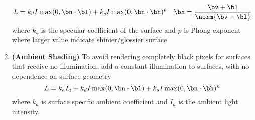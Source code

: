 \documentclass[11pt]{article}
\newcommand{\bheading}[1]{\textbf{(#1)}}
\begin{document}
\begin{enumerate}
    \[
        L = k_d I \max(0, \bn \cdot \bl) + k_s I \max(0, \bn \cdot \bh)^p
        \quad
        \bh = \frac{\bv + \bl}{\norm{\bv + \bl}}    
    \]
    where $k_s$ is the specular coefficient of the surface and $p$ is Phong exponent where larger value indicate shinier/glossier surface
    \item \bheading{Ambient Shading} To avoid rendering completely black pixels for surfaces that receive no illumination, add a constant illumination to surfaces, with no dependence on surface geometry
    \[
        L = k_a I_a + k_d I \max(0, \bn \cdot \bl) + k_s I \max(0, \bn \cdot \bh)^n    
    \]
    where $k_a$ is surface specific ambient coefficient and $I_a$ is the ambient light intensity.
\end{enumerate}
\end{document}
